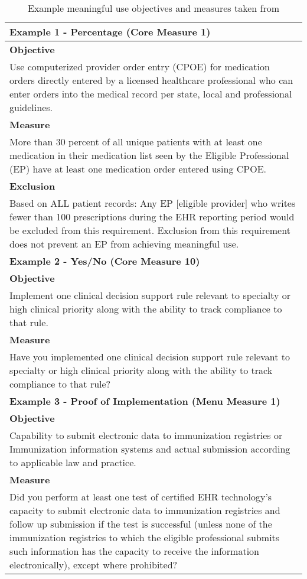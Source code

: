 \begin{table}
	\begin{tabular}{ |p{17.5cm}| }
		\hline
		\textbf{Example 1 - Percentage (Core Measure 1)} \\
		\hline
		\textbf{Objective} \\
		Use computerized provider order entry (CPOE) for medication orders directly entered by a licensed healthcare professional who can enter orders into the medical record per state, local and professional guidelines. \\
		\textbf{Measure} \\
		More than 30 percent of all unique patients with at least one medication in their medication list seen by the Eligible Professional (EP) have at least one medication order entered using CPOE. \\
		\textbf{Exclusion} \\
		Based on ALL patient records: Any EP [eligible provider] who writes fewer than 100 prescriptions during the EHR reporting period would be excluded from this requirement. Exclusion from  this requirement does not prevent an EP from achieving meaningful use. \\
		\hline
		\textbf{Example 2 - Yes/No (Core Measure 10)} \\
		\hline
		\textbf{Objective} \\
		Implement one clinical decision support rule relevant to specialty or high clinical priority along with the ability to track compliance to that rule. \\
		\textbf{Measure} \\
		Have you implemented one clinical decision support rule relevant to specialty or high clinical priority along with the ability to track compliance to that rule? \\
		\hline
		\textbf{Example 3 - Proof of Implementation (Menu Measure 1)} \\
		\hline
		\textbf{Objective} \\
		Capability to submit electronic data to immunization registries or Immunization information systems and actual submission according to applicable law and practice. \\
		\textbf{Measure} \\
		Did you perform at least one test of certified EHR technology’s capacity to submit electronic data to immunization registries and follow up submission if the test is successful (unless none of the immunization registries to which the eligible professional submits such information has the capacity to receive the information electronically), except where prohibited? \\
		\hline
		\end{tabular}
		\label{table:mu_metrics_example}
		\caption[Table caption text]{Example meaningful use objectives and measures taken from \cite{mu1-calc}}
\end{table}
